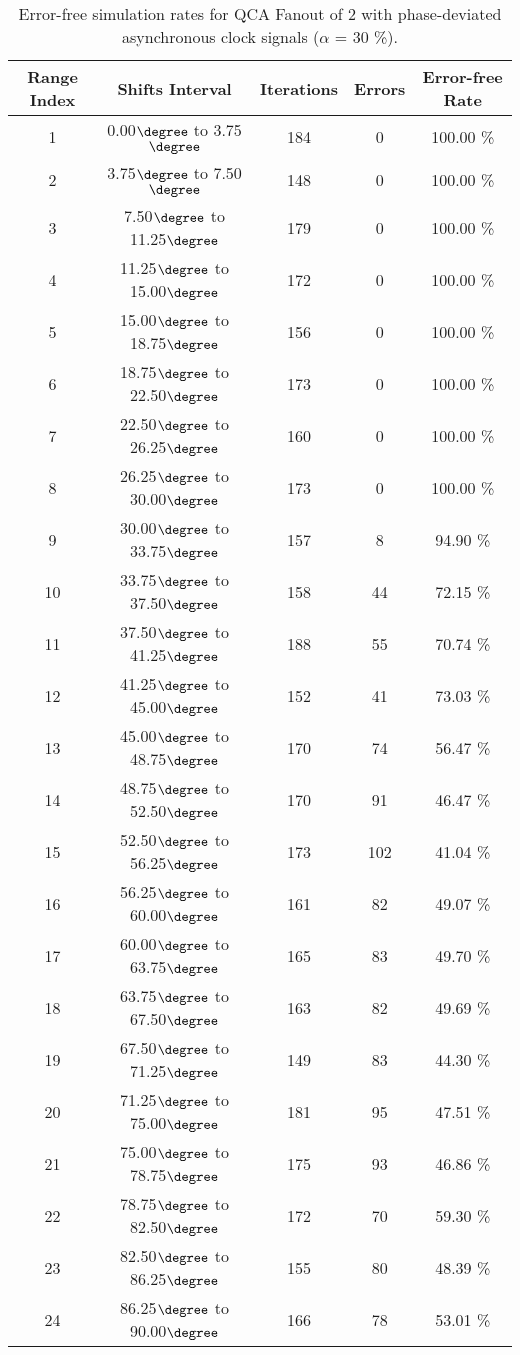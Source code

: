 \flushleft
\begin{table}[h]
\begin{center}
\caption{Error-free simulation rates for QCA Fanout of 2 with phase-deviated asynchronous clock signals ($\alpha$ = 30 \%).}
\begin{tabular}{|c|c|c|c|c|}
\hline
\textbf{Range Index} & \textbf{Shifts Interval} & \textbf{Iterations} & \textbf{Errors} & \textbf{Error-free Rate} \\
\hline
1  &  0.00$\degree$ to  3.75$\degree$ & 184 &  0 & 100.00 \% \\
\hline
2  &  3.75$\degree$ to  7.50$\degree$ & 148 &  0 & 100.00 \% \\
\hline
3  &  7.50$\degree$ to 11.25$\degree$ & 179 &  0 & 100.00 \% \\
\hline
4  & 11.25$\degree$ to 15.00$\degree$ & 172 &  0 & 100.00 \% \\
\hline
5  & 15.00$\degree$ to 18.75$\degree$ & 156 &  0 & 100.00 \% \\
\hline
6  & 18.75$\degree$ to 22.50$\degree$ & 173 &  0 & 100.00 \% \\
\hline
7  & 22.50$\degree$ to 26.25$\degree$ & 160 &  0 & 100.00 \% \\
\hline
8  & 26.25$\degree$ to 30.00$\degree$ & 173 &  0 & 100.00 \% \\
\hline
9  & 30.00$\degree$ to 33.75$\degree$ & 157 &  8 &  94.90 \% \\
\hline
10 & 33.75$\degree$ to 37.50$\degree$ & 158 & 44 &  72.15 \% \\
\hline
11 & 37.50$\degree$ to 41.25$\degree$ & 188 & 55 &  70.74 \% \\
\hline
12 & 41.25$\degree$ to 45.00$\degree$ & 152 & 41 &  73.03 \% \\
\hline
13 & 45.00$\degree$ to 48.75$\degree$ & 170 & 74 &  56.47 \% \\
\hline
14 & 48.75$\degree$ to 52.50$\degree$ & 170 & 91 &  46.47 \% \\
\hline
15 & 52.50$\degree$ to 56.25$\degree$ & 173 & 102 &  41.04 \% \\
\hline
16 & 56.25$\degree$ to 60.00$\degree$ & 161 & 82 &  49.07 \% \\
\hline
17 & 60.00$\degree$ to 63.75$\degree$ & 165 & 83 &  49.70 \% \\
\hline
18 & 63.75$\degree$ to 67.50$\degree$ & 163 & 82 &  49.69 \% \\
\hline
19 & 67.50$\degree$ to 71.25$\degree$ & 149 & 83 &  44.30 \% \\
\hline
20 & 71.25$\degree$ to 75.00$\degree$ & 181 & 95 &  47.51 \% \\
\hline
21 & 75.00$\degree$ to 78.75$\degree$ & 175 & 93 &  46.86 \% \\
\hline
22 & 78.75$\degree$ to 82.50$\degree$ & 172 & 70 &  59.30 \% \\
\hline
23 & 82.50$\degree$ to 86.25$\degree$ & 155 & 80 &  48.39 \% \\
\hline
24 & 86.25$\degree$ to 90.00$\degree$ & 166 & 78 &  53.01 \% \\
\hline


\end{tabular}
\end{center}
\end{table}
